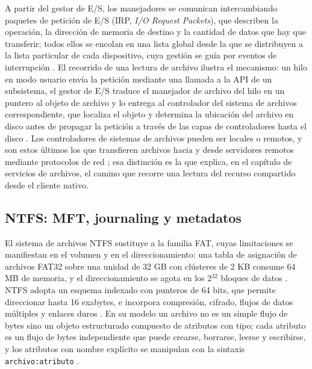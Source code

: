 \documentclass[12pt]{article}
\begin{document}
A partir del gestor de E/S, los manejadores se comunican intercambiando paquetes de petición de E/S (IRP, \textit{I/O Request Packets}), que describen la operación, la dirección de memoria de destino y la cantidad de datos que hay que transferir; todos ellos se encolan en una lista global desde la que se distribuyen a la lista particular de cada dispositivo, cuya gestión se guía por eventos de interrupción \parencite[\S 12.5.5, p.\ 632]{carretero2001sistemas}. El recorrido de una lectura de archivo ilustra el mecanismo: un hilo en modo usuario envía la petición mediante una llamada a la API de un subsistema, el gestor de E/S traduce el manejador de archivo del hilo en un puntero al objeto de archivo y lo entrega al controlador del sistema de archivos correspondiente, que localiza el objeto y determina la ubicación del archivo en disco antes de propagar la petición a través de las capas de controladores hasta el disco \parencite[\S 21.8.1, p.\ 1074]{deitel2004operating}. Los controladores de sistemas de archivos pueden ser locales o remotos, y son estos últimos los que transfieren archivos hacia y desde servidores remotos mediante protocolos de red \parencite[\S 21.8.1, p.\ 1074]{deitel2004operating}; esa distinción es la que explica, en el capítulo de servicios de archivos, el camino que recorre una lectura del recurso compartido desde el cliente nativo.

\subsection{NTFS: MFT, journaling y metadatos}
\label{sec:ntfs}

El sistema de archivos NTFS sustituye a la familia FAT, cuyas limitaciones se manifiestan en el volumen y en el direccionamiento: una tabla de asignación de archivos FAT32 sobre una unidad de 32 GB con clústeres de 2 KB consume 64 MB de memoria, y el direccionamiento se agota en los 2$^{32}$ bloques de datos \parencite[\S 21.8.2, p.\ 1075]{deitel2004operating}. NTFS adopta un esquema indexado con punteros de 64 bits, que permite direccionar hasta 16 exabytes, e incorpora compresión, cifrado, flujos de datos múltiples y enlaces duros \parencite[\S 21.8.2, p.\ 1075]{deitel2004operating}. En su modelo un archivo no es un simple flujo de bytes sino un objeto estructurado compuesto de atributos con tipo; cada atributo es un flujo de bytes independiente que puede crearse, borrarse, leerse y escribirse, y los atributos con nombre explícito se manipulan con la sintaxis \texttt{archivo:atributo} \parencite[\S 22.5.1, p.\ 743]{silberschatz2006fundamentos}.
\end{document}
